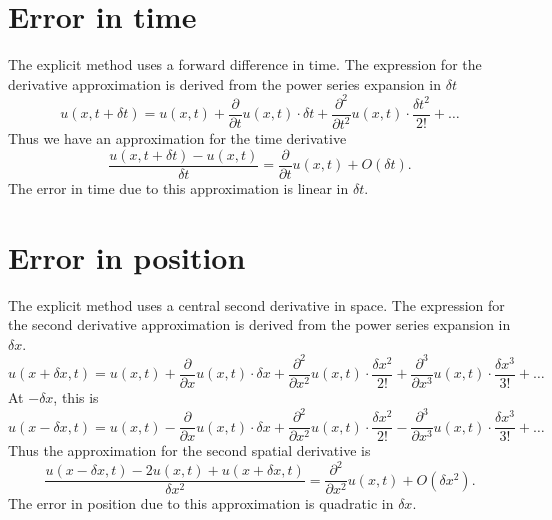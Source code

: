 \documentclass[letterpaper,titlepage,oneside]{report}
\begin{document}
\section*{Error in time}
The explicit method uses a forward difference in time. The
expression for the derivative approximation is derived from
the power series expansion in $\delta t$
\begin{equation}\label{eq:explicitexpansiondt}
  u(x,t+\delta t) = u(x,t) + \frac{\partial}{\partial t}u(x,t)\cdot\delta t
  + \frac{\partial^2}{\partial t^2}u(x,t)\cdot\frac{\delta t^2}{2!} + \dots
\end{equation}
Thus we have an approximation for the time derivative
\begin{equation}\label{eq:expliciterrdt}
  \frac{u(x,t+\delta t)-u(x,t)}{\delta t} = \frac{\partial}{\partial t}u(x,t)
  + O(\delta t).
\end{equation}
The error in time due to this approximation is linear in $\delta t$.

\section*{Error in position}
The explicit method uses a central second derivative in space. The
expression for the second derivative approximation is derived from
the power series expansion in $\delta x$.
\begin{equation}\label{eq:explicitexpansiondx}
  u(x+\delta x,t) = u(x,t) + \frac{\partial}{\partial x}u(x,t)\cdot\delta x +
  \frac{\partial^2}{\partial x^2}u(x,t)\cdot\frac{\delta x^2}{2!} +
  \frac{\partial^3}{\partial x^3}u(x,t)\cdot\frac{\delta x^3}{3!}
  + \dots
\end{equation}
At $-\delta x$, this is
\begin{equation*}
  u(x-\delta x,t) = u(x,t) - \frac{\partial}{\partial x}u(x,t)\cdot\delta x +
  \frac{\partial^2}{\partial x^2}u(x,t)\cdot\frac{\delta x^2}{2!} -
  \frac{\partial^3}{\partial x^3}u(x,t)\cdot\frac{\delta x^3}{3!}
  + \dots
\end{equation*}
Thus the approximation for the second spatial derivative is
\begin{equation}\label{eq:expliciterrdx}
  \frac{u(x-\delta x,t)-2u(x,t)+u(x+\delta x,t)}{\delta x^2} =
  \frac{\partial^2}{\partial x^2}u(x,t) + O(\delta x^2).
\end{equation}
The error in position due to this approximation is quadratic in $\delta x$.
\end{document}
